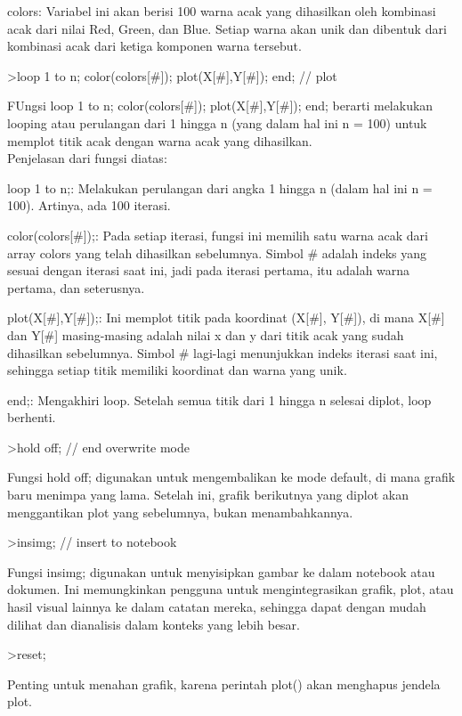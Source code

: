 \documentclass[a4paper,10pt]{article}
\begin{document}
\begin{eulernotebook}
\begin{eulercomment}
colors: Variabel ini akan berisi 100 warna acak yang dihasilkan oleh
kombinasi acak dari nilai Red, Green, dan Blue. Setiap warna akan unik
dan dibentuk dari kombinasi acak dari ketiga komponen warna tersebut.
\end{eulercomment}
\begin{eulerprompt}
>loop 1 to n; color(colors[#]); plot(X[#],Y[#]); end; // plot
\end{eulerprompt}
\begin{eulercomment}
FUngsi loop 1 to n; color(colors[#]); plot(X[#],Y[#]); end; berarti
melakukan looping atau perulangan dari 1 hingga n (yang dalam hal ini
n = 100) untuk memplot titik acak dengan warna acak yang dihasilkan.\\
Penjelasan dari fungsi diatas:

loop 1 to n;: Melakukan perulangan dari angka 1 hingga n (dalam hal
ini n = 100). Artinya, ada 100 iterasi.

color(colors[#]);: Pada setiap iterasi, fungsi ini memilih satu warna
acak dari array colors yang telah dihasilkan sebelumnya. Simbol #
adalah indeks yang sesuai dengan iterasi saat ini, jadi pada iterasi
pertama, itu adalah warna pertama, dan seterusnya.

plot(X[#],Y[#]);: Ini memplot titik pada koordinat (X[#], Y[#]), di
mana X[#] dan Y[#] masing-masing adalah nilai x dan y dari titik acak
yang sudah dihasilkan sebelumnya. Simbol # lagi-lagi menunjukkan
indeks iterasi saat ini, sehingga setiap titik memiliki koordinat dan
warna yang unik.

end;: Mengakhiri loop. Setelah semua titik dari 1 hingga n selesai
diplot, loop berhenti.
\end{eulercomment}
\begin{eulerprompt}
>hold off; // end overwrite mode
\end{eulerprompt}
\begin{eulercomment}
Fungsi hold off; digunakan untuk mengembalikan ke mode default, di
mana grafik baru menimpa yang lama. Setelah ini, grafik berikutnya
yang diplot akan menggantikan plot yang sebelumnya, bukan
menambahkannya.
\end{eulercomment}
\begin{eulerprompt}
>insimg; // insert to notebook
\end{eulerprompt}
\begin{eulercomment}
Fungsi insimg; digunakan untuk menyisipkan gambar ke dalam notebook
atau dokumen. Ini memungkinkan pengguna untuk mengintegrasikan grafik,
plot, atau hasil visual lainnya ke dalam catatan mereka, sehingga
dapat dengan mudah dilihat dan dianalisis dalam konteks yang lebih
besar.
\end{eulercomment}
\begin{eulerprompt}
>reset;
\end{eulerprompt}
\begin{eulercomment}
Penting untuk menahan grafik, karena perintah plot() akan menghapus
jendela plot.


\end{eulercomment}
\end{eulernotebook}
\end{document}
